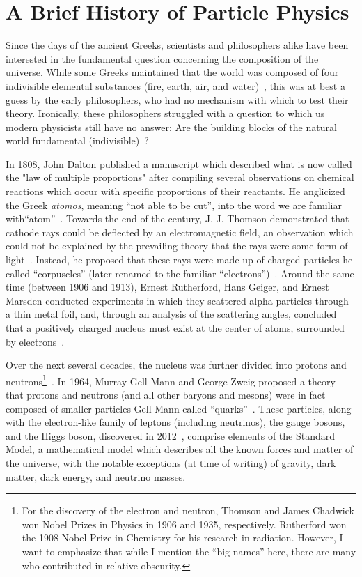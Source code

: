 \section{A Brief History of Particle Physics}\label{sec:a_brief_history_of_particle_physics}

Since the days of the ancient Greeks, scientists and philosophers alike have been interested in the fundamental question concerning the composition of the universe. While some Greeks maintained that the world was composed of four indivisible elemental substances (fire, earth, air, and water)~\cite{aristotle_metaphysics_350bce}, this was at best a guess by the early philosophers, who had no mechanism with which to test their theory. Ironically, these philosophers struggled with a question to which us modern physicists still have no answer: Are the building blocks of the natural world fundamental (indivisible)~\cite{aristotle_physics_350bce}?

In 1808, John Dalton published a manuscript which described what is now called the "law of multiple proportions" after compiling several observations on chemical reactions which occur with specific proportions of their reactants. He anglicized the Greek \textit{atomos}, meaning ``not able to be cut'', into the word we are familiar with\textemdash ``atom''~\cite{dalton_new_1808}. Towards the end of the century, J. J. Thomson demonstrated that cathode rays could be deflected by an electromagnetic field, an observation which could not be explained by the prevailing theory that the rays were some form of light~\cite{thomson_cathode_1897}. Instead, he proposed that these rays were made up of charged particles he called ``corpuscles'' (later renamed to the familiar ``electrons'')~\cite{thomson_corpuscular_1907}. Around the same time (between 1906 and 1913), Ernest Rutherford, Hans Geiger, and Ernest Marsden conducted experiments in which they scattered alpha particles through a thin metal foil, and, through an analysis of the scattering angles, concluded that a positively charged nucleus must exist at the center of atoms, surrounded by electrons~\cite{rutherford_lxxix_1911}.

Over the next several decades, the nucleus was further divided into protons and neutrons\footnote{For the discovery of the electron and neutron, Thomson and James Chadwick won Nobel Prizes in Physics in 1906 and 1935, respectively. Rutherford won the 1908 Nobel Prize in Chemistry for his research in radiation. However, I want to emphasize that while I mention the ``big names'' here, there are many who contributed in relative obscurity.}~\cite{masson_xxiv_1921,chadwick_possible_1932}. In 1964, Murray Gell-Mann and George Zweig proposed a theory that protons and neutrons (and all other baryons and mesons) were in fact composed of smaller particles Gell-Mann called ``quarks''~\cite{gell-mann_schematic_1964}. These particles, along with the electron-like family of leptons (including neutrinos), the gauge bosons, and the Higgs boson, discovered in 2012~\cite{aad_observation_2012}, comprise elements of the Standard Model, a mathematical model which describes all the known forces and matter of the universe, with the notable exceptions (at time of writing) of gravity, dark matter, dark energy, and neutrino masses.

